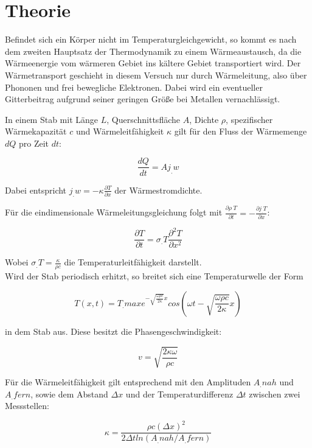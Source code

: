 
\section{Theorie}
\label{sec:Theorie}

Befindet sich ein Körper nicht im Temperaturgleichgewicht, so kommt es nach dem zweiten Hauptsatz der Thermodynamik zu einem Wärmeaustausch, da die Wärmeenergie vom wärmeren Gebiet ins kältere Gebiet transportiert wird. Der Wärmetransport geschieht in diesem Versuch nur durch Wärmeleitung, also über Phononen und frei bewegliche Elektronen. Dabei wird ein eventueller Gitterbeitrag aufgrund seiner geringen Größe bei Metallen vernachlässigt.

In einem Stab mit Länge $L$, Querschnittsfläche $A$, Dichte $\rho$, spezifischer Wärmekapazität $c$ und Wärmeleitfähigkeit $\kappa$ gilt für den Fluss der Wärmemenge $dQ$ pro Zeit $dt$:

\begin{equation}
\frac{dQ}{dt} = A j_.w \label{eq:dQ/dt}
\end{equation}    

Dabei entspricht $j_.w = -\kappa \frac{\partial T}{\partial x}$ der Wärmestromdichte. 

Für die eindimensionale Wärmeleitungsgleichung folgt mit $\frac{\partial \rho_.T}{\partial t} = -\frac{\partial j_.T}{\partial x}$:

\begin{equation}
\frac{\partial T}{\partial t} = \sigma_.T \frac{\partial^2 T}{\partial x^2} \label{eq:T/t}
\end{equation}

Wobei $\sigma_.T = \frac{\kappa}{\rho c}$ die Temperaturleitfähigkeit darstellt.\\

Wird der Stab periodisch erhitzt, so breitet sich eine Temperaturwelle der Form

\begin{equation}
T(x, t) = T_.{max} e^{-\sqrt{\frac{\omega\rho c}{2\kappa}} x}cos\left(\omega t-\sqrt{\frac{\omega\rho c}{2\kappa}}x\right) \label{eq:T}
\end{equation}

in dem Stab aus. Diese besitzt die Phasengeschwindigkeit:

\begin{equation}
v = \sqrt{\frac{2\kappa\omega}{\rho c}} \label{eq:v}
\end{equation}

Für die Wärmeleitfähigkeit gilt entsprechend mit den Amplituden $A_.{nah}$ und $A_.{fern}$, sowie dem Abstand $\Delta x$ und der Temperaturdifferenz $\Delta t$  zwischen zwei Messstellen: 

\begin{equation}
\kappa = \frac{\rho c(\Delta x)^2}{2\Delta t ln(A_.{nah}/A_.{fern})} \label{eq:k}
\end{equation}